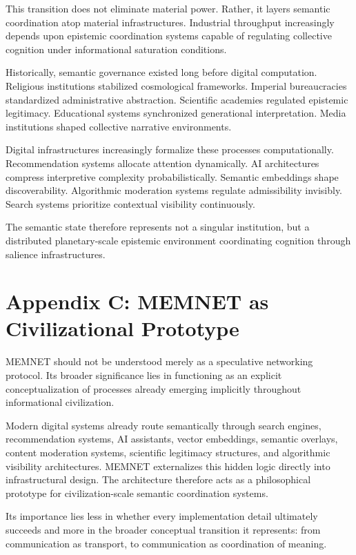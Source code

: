 \documentclass[11pt,a4paper]{article}
\begin{document}
This transition does not eliminate material power. Rather, it layers semantic coordination atop material infrastructures. Industrial throughput increasingly depends upon epistemic coordination systems capable of regulating collective cognition under informational saturation conditions.

Historically, semantic governance existed long before digital computation. Religious institutions stabilized cosmological frameworks. Imperial bureaucracies standardized administrative abstraction. Scientific academies regulated epistemic legitimacy. Educational systems synchronized generational interpretation. Media institutions shaped collective narrative environments.

Digital infrastructures increasingly formalize these processes computationally. Recommendation systems allocate attention dynamically. AI architectures compress interpretive complexity probabilistically. Semantic embeddings shape discoverability. Algorithmic moderation systems regulate admissibility invisibly. Search systems prioritize contextual visibility continuously.

The semantic state therefore represents not a singular institution, but a distributed planetary-scale epistemic environment coordinating cognition through salience infrastructures.

\section{Appendix C: MEMNET as Civilizational Prototype}

MEMNET should not be understood merely as a speculative networking protocol. Its broader significance lies in functioning as an explicit conceptualization of processes already emerging implicitly throughout informational civilization.

Modern digital systems already route semantically through search engines, recommendation systems, AI assistants, vector embeddings, semantic overlays, content moderation systems, scientific legitimacy structures, and algorithmic visibility architectures. MEMNET externalizes this hidden logic directly into infrastructural design. The architecture therefore acts as a philosophical prototype for civilization-scale semantic coordination systems.

Its importance lies less in whether every implementation detail ultimately succeeds and more in the broader conceptual transition it represents: from communication as transport, to communication as coordination of meaning.
\end{document}
